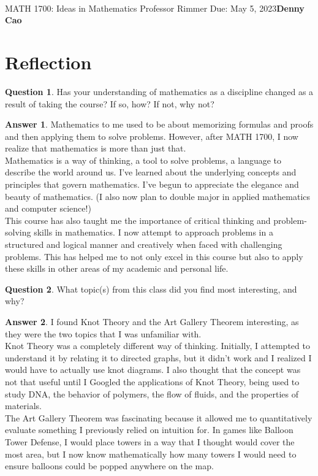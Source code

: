 \documentclass[article, 12pt]{article}
\title{\Large\bf{\psetName}}
\makeatletter
\theoremstyle{definition}
\newcommand{\courseNumber}{MATH 1700}
\newcommand{\courseName}{Ideas in Mathematics}
\newcommand{\professor}{Professor Rimmer}
\newcommand{\dueDate}{Due: May 5, 2023}
\newcommand{\name}{Denny Cao}
\newtheorem{question}{Question}
\newtheorem{answer}{Answer}
\renewcommand{\maketitle}{\bgroup\setlength{\parindent}{0pt}
    \begin{flushleft}
        \textbf{\@title} \\ \vskip0.2cm
        \begingroup
            \fontsize{14pt}{12pt}\selectfont
            \courseNumber: \courseName 
            \vskip0.3cm 
            \professor
        \endgroup \vskip0.3cm
        \dueDate \hfill\rlap{}\bf{\name} \\ \vskip0.1cm
        \hrulefill
    \end{flushleft}\egroup 
}
\makeatother
\begin{document}
    \maketitle
    \thispagestyle{plain}
    \section{Reflection}
    \begin{question}
        Has your understanding of mathematics as a discipline changed as a result of taking the course? If so, how? If not, why not?
    \end{question}
    \begin{answer}
        Mathematics to me used to be about memorizing formulas and proofs and then applying them to solve problems. However, after MATH 1700, I now realize that mathematics is more than just that.
        \\[12pt]
        Mathematics is a way of thinking, a tool to solve problems, a language to describe the world around us. I've learned about the underlying concepts and principles that govern mathematics. I've begun to appreciate the elegance and beauty of mathematics. (I also now plan to double major in applied mathematics and computer science!)
        \\[12pt]
        This course has also taught me the importance of critical thinking and problem-solving skills in mathematics. I now attempt to approach problems in a structured and logical manner and creatively when faced with challenging problems. This has helped me to not only excel in this course but also to apply these skills in other areas of my academic and personal life.
    \end{answer}

    \begin{question}
        What topic(s) from this class did you find most interesting, and why?    
    \end{question}
    \begin{answer}
        I found Knot Theory and the Art Gallery Theorem interesting, as they were the two topics that I was unfamiliar with. 
        \\[12pt] 
        Knot Theory was a completely different way of thinking. Initially, I attempted to understand it by relating it to directed graphs, but it didn't work and I realized I would have to actually use knot diagrams. I also thought that the concept was not that useful until I Googled the applications of Knot Theory, being used to study DNA, the behavior of polymers, the flow of fluids, and the properties of materials. 
        \\[12pt]
        The Art Gallery Theorem was fascinating because it allowed me to quantitatively evaluate something I previously relied on intuition for. In games like Balloon Tower Defense, I would place towers in a way that I thought would cover the most area, but I now know mathematically how many towers I would need to ensure balloons could be popped anywhere on the map.
    \end{answer}
    
\end{document}
